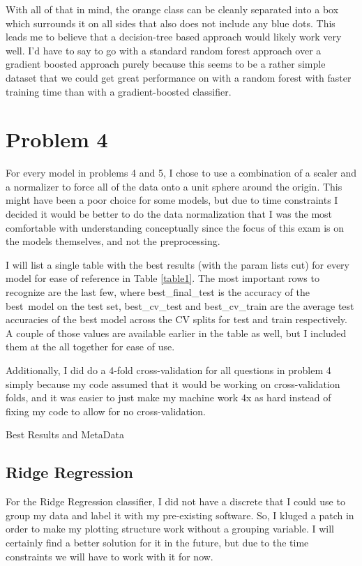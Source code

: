 \documentclass[12pt]{article}
\begin{document}
With all of that in mind, the orange class can be cleanly separated into a box which surrounds it on all sides that 
also does not include any blue dots. This leads me to believe that a decision-tree based approach would likely work very well.
I'd have to say to go with a standard random forest approach over a gradient boosted approach purely because this seems to 
be a rather simple dataset that we could get great performance on with a random forest with faster training time than 
with a gradient-boosted classifier. 

\section{Problem 4}
For every model in problems 4 and 5, I chose to use a combination of a scaler and a normalizer to force all of the data 
onto a unit sphere around the origin. This might have been a poor choice for some models, but due to time constraints 
I decided it would be better to do the data normalization that I was the most comfortable with understanding conceptually
since the focus of this exam is on the models themselves, and not the preprocessing.


I will list a single table with the best results (with the param lists cut) for every model for ease of reference 
in Table \ref{table1}. The most important rows to recognize are the last few, where best\_final\_test is the accuracy 
of the best\ model on the test set, best\_cv\_test and best\_cv\_train are the average test accuracies of the best model
 across the CV splits for test and train respectively. A couple of those values are available earlier in the table as well,
 but I included them at the all together for ease of use. 

Additionally, I did do a 4-fold cross-validation for all questions in problem 4 simply because my code assumed that it 
would be working on cross-validation folds, and it was easier to just make my machine work 4x as hard instead of fixing my 
code to allow for no cross-validation.

\begin{table}
  \resizebox*{.95\textwidth}{!}{}
  \caption{Best Results and MetaData}
  \label{table1}
\end{table}

\subsection{Ridge Regression}
For the Ridge Regression classifier, I did not have a discrete that I could use to group my data and label it with 
my pre-existing software. So, I kluged a patch in order to make my plotting structure work without a grouping variable.
I will certainly find a better solution for it in the future, but due to the time constraints we will have to work with 
it for now.
\end{document}
